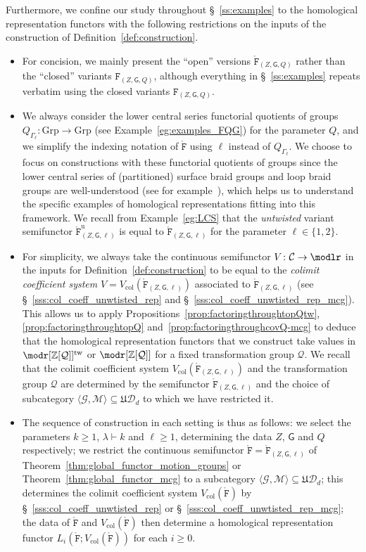 \documentclass[AHL,Unicode,published]{cedram}
\newcommand{\Int}{\mathring}
\newcommand{\tw}{\mathrm{tw}}
\newcommand{\groups}{\ensuremath{\mathrm{Grp}}}
\newcommand{\col}{\mathrm{col}}
\newcommand{\unt}{\mathrm{u}}
\newcommand{\LCS}{\varGamma}
\newcommand{\fU}{\ensuremath{\mathfrak{U}}}
\newcommand{\tF}{\mathtt{F}}
\newcommand{\sG}{\mathsf{G}}
\newcommand{\cC}{\mathcal{C}}
\newcommand{\cD}{\mathcal{D}}
\newcommand{\cG}{\mathcal{G}}
\newcommand{\cM}{\mathcal{M}}
\newcommand{\cQ}{\mathcal{Q}}
\newcommand{\bZ}{\mathbb{Z}}
\renewcommand{\geq}{\geqslant}
\begin{document}
Furthermore, we confine our study throughout \S~\ref{ss:examples} to the homological representation functors with the following restrictions on the inputs of the construction of Definition~\ref{def:construction}.
\begin{itemize}
\item For concision, we mainly present the ``open'' versions $\Int{\tF}_{(Z,\sG,Q)}$ rather than the ``closed'' variants $\tF_{(Z,\sG,Q)}$, although everything in \S~\ref{ss:examples} repeats verbatim using the closed variants $\tF_{(Z,\sG,Q)}$.
\item We always consider the lower central series functorial quotients of groups $Q_{\LCS_{\ell}}\colon \groups \to \groups$ (see Example~\ref{eg:examples_FQG}) for the parameter $Q$, and we simplify the indexing notation of $\Int{\tF}$ using $\ell$ instead of $Q_{\LCS_{\ell}}$. We choose to focus on constructions with these functorial quotients of groups since the lower central series of (partitioned) surface braid groups and loop braid groups are well-understood (see for example~\cite{DPS}), which helps us to understand the specific examples of homological representations fitting into this framework. We recall from Example~\ref{eg:LCS} that the \emph{untwisted} variant semifunctor $\Int{\tF}^{\unt}_{(Z,\sG,\ell)}$ is equal to $\Int{\tF}_{(Z,\sG,\ell)}$ for the parameter $\ell\in\{1,2\}$.
\item For simplicity, we always take the continuous semifunctor $V \colon \cC \to \modlr$ in the inputs for Definition~\ref{def:construction} to be equal to the \emph{colimit coefficient system} $V = V_{\col}(\Int{\tF}_{(Z,\sG,\ell)})$ associated to $\Int{\tF}_{(Z,\sG,\ell)}$ (see \S~\ref{sss:col_coeff_unwtisted_rep} and \S~\ref{sss:col_coeff_unwtisted_rep_mcg}). This allows us to apply Propositions~\ref{prop:factoringthroughtopQtw}, \ref{prop:factoringthroughtopQ} and~\ref{prop:factoringthroughcovQ-mcg} to deduce that the homological representation functors that we construct take values in $\modr[{\bZ[\cQ]}]^{\tw}$ or $\modr[{\bZ[\cQ]}]$ for a fixed transformation group $\cQ$. We recall that the colimit coefficient system $V_{\col}(\Int{\tF}_{(Z,\sG,\ell)})$ and the transformation group $\cQ$ are determined by the semifunctor $\Int{\tF}_{(Z,\sG,\ell)}$ and the choice of subcategory $\langle \cG, \cM \rangle \subseteq \fU\cD_d$ to which we have restricted it.
\item The sequence of construction in each setting is thus as follows: we select the parameters $k \geq 1$, $\lambda \vdash k$ and $\ell \geq 1$, determining the data $Z$, $\sG$ and $Q$ respectively; we restrict the continuous semifunctor $\Int{\tF} = \Int{\tF}_{(Z,\sG,\ell)}$ of Theorem~\ref{thm:global_functor_motion_groups} or Theorem~\ref{thm:global_functor_mcg} to a subcategory $\langle \cG, \cM \rangle \subseteq \fU\cD_d$; this determines the colimit coefficient system $V_{\col}(\Int{\tF})$ by \S~\ref{sss:col_coeff_unwtisted_rep} or \S~\ref{sss:col_coeff_unwtisted_rep_mcg}; the data of $\Int{\tF}$ and $V_{\col}(\Int{\tF})$ then determine a homological representation functor $L_i(\Int{\tF};V_{\col}(\Int{\tF}))$ for each $i\geq 0$.
\end{itemize}
\end{document}
